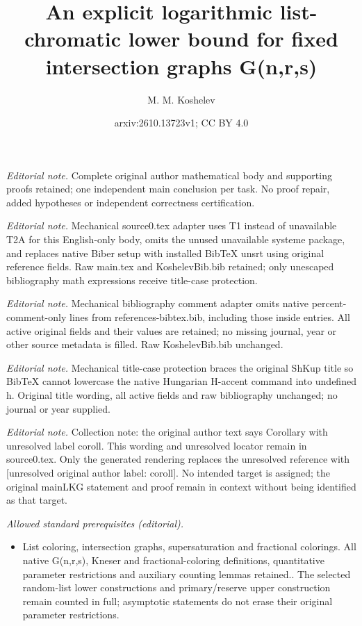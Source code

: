 \documentclass[10pt,a4paper]{article}
\title{An explicit logarithmic list-chromatic lower bound for fixed intersection graphs G(n,r,s)}
\author{M. M. Koshelev}
\date{arxiv:2610.13723v1; CC BY 4.0}
\theoremstyle{remark}
\theoremstyle{definition}
\begin{document}
\maketitle
\noindent\textit{Editorial note.} Complete original author mathematical body and supporting proofs retained; one independent main conclusion per task. No proof repair, added hypotheses or independent correctness certification.\par\medskip
\noindent\textit{Editorial note.} Mechanical source0.tex adapter uses T1 instead of unavailable T2A for this English-only body, omits the unused unavailable systeme package, and replaces native Biber setup with installed BibTeX unsrt using original reference fields. Raw main.tex and KoshelevBib.bib retained; only unescaped bibliography math expressions receive title-case protection.\par\medskip
\noindent\textit{Editorial note.} Mechanical bibliography comment adapter omits native percent-comment-only lines from references-bibtex.bib, including those inside entries. All active original fields and their values are retained; no missing journal, year or other source metadata is filled. Raw KoshelevBib.bib unchanged.\par\medskip
\noindent\textit{Editorial note.} Mechanical title-case protection braces the original ShKup title so BibTeX cannot lowercase the native Hungarian H-accent command into undefined h. Original title wording, all active fields and raw bibliography unchanged; no journal or year supplied.\par\medskip
\noindent\textit{Editorial note.} Collection note: the original author text says Corollary with unresolved label coroll. This wording and unresolved locator remain in source0.tex. Only the generated rendering replaces the unresolved reference with [unresolved original author label: coroll]. No intended target is assigned; the original mainLKG statement and proof remain in context without being identified as that target.\par\medskip
\noindent\textit{Allowed standard prerequisites (editorial).}\begin{itemize}
\item List coloring, intersection graphs, supersaturation and fractional colorings. All native G(n,r,s), Kneser and fractional-coloring definitions, quantitative parameter restrictions and auxiliary counting lemmas retained.. The selected random-list lower constructions and primary/reserve upper construction remain counted in full; asymptotic statements do not erase their original parameter restrictions.
\end{itemize}\medskip
\end{document}
